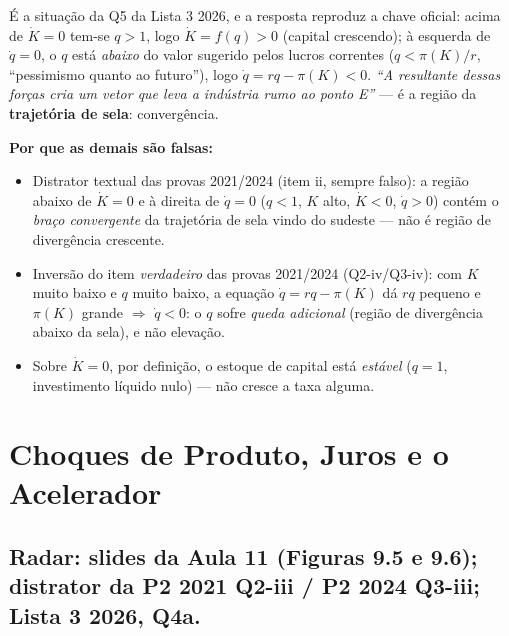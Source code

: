 \documentclass[12pt, a4paper]{article}
\begin{document}
\begin{correctbox}[title={Resposta correta: c)}]
É a situação da Q5 da Lista 3 2026, e a resposta reproduz a chave oficial:
acima de $\dot{K}=0$ tem-se $q > 1$, logo
$\dot{K} = f(q) > 0$ (capital crescendo); à esquerda de $\dot{q}=0$, o $q$ está
\emph{abaixo} do valor sugerido pelos lucros correntes
($q < \pi(K)/r$, ``pessimismo quanto ao futuro''), logo
$\dot{q} = rq - \pi(K) < 0$. \emph{``A resultante dessas forças cria um vetor
que leva a indústria rumo ao ponto E''} --- é a região da
\textbf{trajetória de sela}: convergência. \checkmark

\textbf{Por que as demais são falsas:}
\begin{itemize}[leftmargin=*]
\item[a)] Distrator textual das provas 2021/2024 (item ii, sempre falso): a
região abaixo de $\dot{K}=0$ e à direita de $\dot{q}=0$ ($q<1$, $K$ alto,
$\dot{K}<0$, $\dot{q}>0$) contém o \emph{braço convergente} da trajetória de
sela vindo do sudeste --- não é região de divergência crescente.
\item[b)] Inversão do item \emph{verdadeiro} das provas 2021/2024 (Q2-iv/Q3-iv):
com $K$ muito baixo e $q$ muito baixo, a equação $\dot{q} = rq - \pi(K)$ dá
$rq$ pequeno e $\pi(K)$ grande $\Rightarrow$ $\dot{q} < 0$: o $q$ sofre
\emph{queda adicional} (região de divergência abaixo da sela), e não elevação.
\item[d)] Sobre $\dot{K}=0$, por definição, o estoque de capital está
\emph{estável} ($q=1$, investimento líquido nulo) --- não cresce a taxa
alguma.
\end{itemize}
\end{correctbox}

\section{Choques de Produto, Juros e o Acelerador}

\subsection{Radar: slides da Aula 11 (Figuras 9.5 e 9.6); distrator da P2 2021 Q2-iii / P2 2024 Q3-iii; Lista 3 2026, Q4a.}
\end{document}
